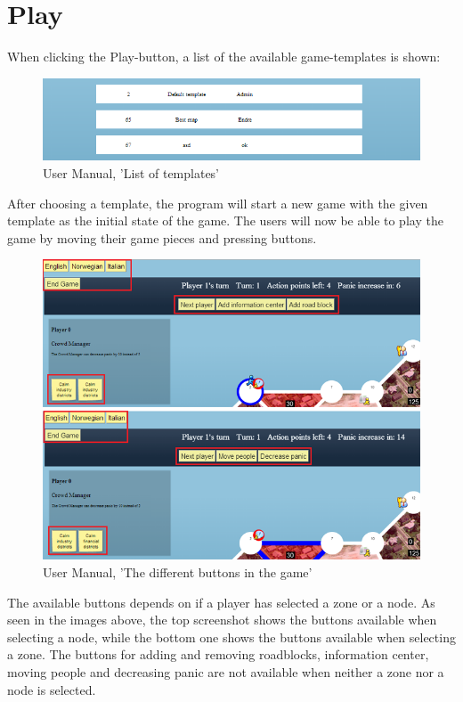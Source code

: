 \section{Play}

When clicking the Play-button, a list of the available game-templates is shown:

\begin{figure}[H]
  \centering
    \includegraphics[width=1.0\textwidth]{img/gamelist.png}
  \caption{User Manual, 'List of templates'}
  \label{fig:gamelist}
\end{figure}

\noindent After choosing a template, the program will start a new game with the given template as the initial state of the game. The users will now be able to play the game by moving their game pieces and pressing buttons.

\begin{figure}[H]
  \centering
    \includegraphics[width=1.0\textwidth]{img/buttonsbothred.png}
  \caption{User Manual, 'The different buttons in the game'}
  \label{fig:buttons}
\end{figure}

\noindent The available buttons depends on if a player has selected a zone or a node. As seen in the images above, the top screenshot shows the buttons available when selecting a node, while the bottom one shows the buttons available when selecting a zone. The buttons for adding and removing roadblocks, information center, moving people and decreasing panic are not available when neither a zone nor a node is selected.

